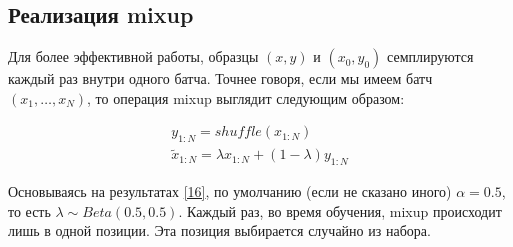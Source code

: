 \subsection{Реализация mixup}
Для более эффективной работы, образцы $(x, y)$ и $(x_0, y_0)$ семплируются каждый раз внутри одного батча. Точнее говоря, если мы имеем батч $(x_1, \dots, x_N)$, то операция mixup выглядит следующим образом:

\begin{equation}
\begin{split}
y_{1:N} = shuffle(x_{1:N}) \\
\tilde{x}_{1:N} = \lambda x_{1:N} + (1 - \lambda) y_{1:N}
\end{split}
\end{equation}

Основываясь на результатах \hyperlink{cite.Bas19}{[16]}, по умолчанию (если не сказано иного) $\alpha = 0.5$, то есть $\lambda \sim Beta(0.5, 0.5)$. Каждый раз, во время обучения, mixup происходит лишь в одной позиции. Эта позиция выбирается случайно из набора.

\newpage